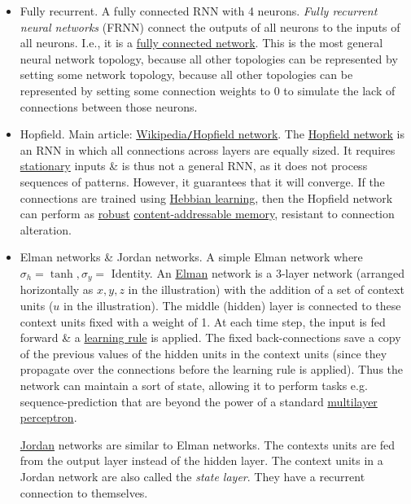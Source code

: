 \documentclass{article}
\begin{document}
\begin{itemize}
	\item {\sf Fully recurrent.} {\sf A fully connected RNN with 4 neurons.} {\it Fully recurrent neural networks} (FRNN) connect the outputs of all neurons to the inputs of all neurons. I.e., it is a \href{https://en.wikipedia.org/wiki/Fully_connected_network}{fully connected network}. This is the most general neural network topology, because all other topologies can be represented by setting some network topology, because all other topologies can be represented by setting some connection weights to 0 to simulate the lack of connections between those neurons.
	\item {\sf Hopfield.} Main article: \href{https://en.wikipedia.org/wiki/Hopfield_network}{Wikipedia{\tt/}Hopfield network}. The \href{https://en.wikipedia.org/wiki/Hopfield_network}{Hopfield network} is an RNN in which all connections across layers are equally sized. It requires \href{https://en.wikipedia.org/wiki/Stationary_process}{stationary} inputs \& is thus not a general RNN, as it does not process sequences of patterns. However, it guarantees that it will converge. If the connections are trained using \href{https://en.wikipedia.org/wiki/Hebbian_learning}{Hebbian learning}, then the Hopfield network can perform as \href{https://en.wikipedia.org/wiki/Robustness_(computer_science)}{robust} \href{https://en.wikipedia.org/wiki/Content-addressable_memory}{content-addressable memory}, resistant to connection alteration.
	\item {\sf Elman networks \& Jordan networks.} {\sf A simple Elman network where $\sigma_h = \tanh,\sigma_y =$ Identity.} An \href{https://en.wikipedia.org/wiki/Jeff_Elman}{Elman} network is a 3-layer network (arranged horizontally as $x,y,z$ in the illustration) with the addition of a set of context units ($u$ in the illustration). The middle (hidden) layer is connected to these context units fixed with a weight of 1. At each time step, the input is fed forward \& a \href{https://en.wikipedia.org/wiki/Learning_rule}{learning rule} is applied. The fixed back-connections save a copy of the previous values of the hidden units in the context units (since they propagate over the connections before the learning rule is applied). Thus the network can maintain a sort of state, allowing it to perform tasks e.g. sequence-prediction that are beyond the power of a standard \href{https://en.wikipedia.org/wiki/Multilayer_perceptron}{multilayer perceptron}.
	
	\href{https://en.wikipedia.org/wiki/Michael_I._Jordan}{Jordan} networks are similar to Elman networks. The contexts units are fed from the output layer instead of the hidden layer. The context units in a Jordan network are also called the {\it state layer}. They have a recurrent connection to themselves.
	

\end{itemize}
\end{document}
